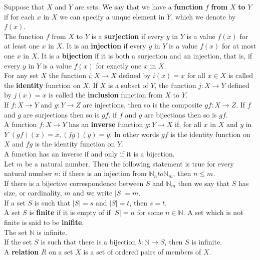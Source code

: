 \documentclass[10pt,landscape]{article}
\begin{document}
\begin{multicols}{3}
Suppose that $X$ and $Y$ are sets. We say that we have a \textbf{function} $f$ \textbf{from} $X$ \textbf{to} $Y$ if for each $x$ in $X$ we can specify a unque element in $Y$, which we denote by $f(x)$.\\
The function $f$ from $X$ to $Y$ is a \textbf{surjection} if every $y$ in $Y$ is a value $f(x)$ for at least one $x$ in $X$. It is an \textbf{injection} if every $y$ in $Y$ is a value $f(x)$ for at most one $x$ in $X$. It is a \textbf{bijection} if it is both a surjection and an injection, that is, if every $y$ in $Y$ is a value $f(x)$ for exactly one $x$ in $X$.\\
For any set $X$ the function $i : X \to X$ defined by $i(x) = x$ for all $x \in X$ is called the \textbf{identity} function on $X$. If $X$ is a subset of $Y$, the function $j : X \to Y$ defined by $j(x) = x$ is called the \textbf{inclusion} function from $X$ to $Y$.\\
If $f : X \to Y$ and $g : Y \to Z$ are injections, then so is the composite $gf : X \to Z$. If $f$ and $g$ are surjections then so is $gf$. if $f$ and $g$ are bijections then so is $gf$.\\
A function $f : X \to Y$ has an \textbf{inverse} function $g : Y \to X$ if, for all $x$ in $X$ and $y$ in $Y$ $(gf)(x) = x, (fg)(y) = y$. In other words $gf$ is the identity function on $X$ and $fg$ is the identity function on $Y$.\\
A function has an inverse if and only if it is a bijection.\\
Let $m$ be a natural number. Then the following statement is true for every natural number $n$: if there is an injection from $\mathbb{N}_n to \mathbb{N}_m$, then $n \leq m$.\\ 
If there is a bijective correspondence between $S$ and $\mathbb{N}_m$ then we say that $S$ has size, or cardinality, $m$ and we write $|S| = m$.\\
If a set $S$ is such that $|S| = s$ and $|S| = t$, then $s = t$.\\
A set $S$ is \textbf{finite} if it is empty of if $|S| = n$ for some $n \in \mathbb{N}$. A set which is not finite is said to be \textbf{inifite}.\\
The set $\mathbb{N}$ is infinite.\\
If the set $S$ is such that there is a bijection $b : \mathbb{N} \to S$, then $S$ is infinite.\\
A \textbf{relation} $R$ on a set $X$ is a set of ordered pairs of members of $X$.\\

\end{multicols}
\end{document}
